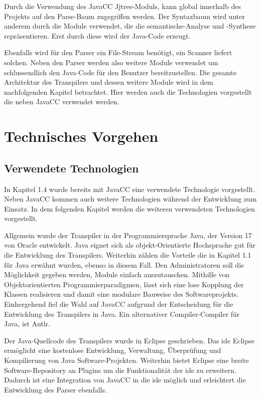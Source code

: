 Durch die Verwendung des JavaCC Jjtree-Moduls, kann global innerhalb des Projekts auf den Parse-Baum zugegriffen werden. 
Der Syntaxbaum wird unter anderem durch die Module verwendet, die die semantische-Analyse und -Synthese repräsentieren.
Erst durch diese wird der Java-Code erzeugt.

Ebenfalls wird für den Parser ein File-Stream benötigt, ein Scanner liefert solchen.
Neben den Parser werden also weitere Module verwendet um schlussendlich den Java-Code für den Benutzer bereitzustellen.
Die gesamte Architektur des Transpilers und dessen weitere Module wird in dem nachfolgenden Kapitel betrachtet. 
Hier werden auch die Technologien vorgestellt die neben JavaCC verwendet werden. 

\section{Technisches Vorgehen}
\subsection{Verwendete Technologien}
In Kapitel 1.4 wurde bereits mit JavaCC eine verwendete Technologie vorgestellt. Neben JavaCC kommen auch weitere Technologien während der Entwicklung zum Einsatz. In dem folgenden Kapitel werden die weiteren verwendeten Technologien vorgestellt.

Allgemein wurde der Transpiler in der Programmiersprache Java, der Version 17 von Oracle entwickelt. 
Java eignet sich  als objekt-Orientierte Hochsprache gut für die Entwicklung des Transpilers. 
Weiterhin zählen die Vorteile die in Kapitel 1.1 für Java erwähnt wurden, ebenso in diesem Fall. Den Administratoren soll die Möglichkeit gegeben werden, Module einfach auszutauschen. Mithilfe von Objektorientierten Programmierparadigmen, lässt sich eine lose Kopplung der Klassen realisieren und damit eine modulare Bauweise des Softwareprojekts.
Einhergehend fiel die Wahl auf JavaCC aufgrund der Entscheidung für die Entwicklung des Transpilers in Java. Ein alternativer Compiler-Compiler für Java, ist Antlr. 

Der Java-Quellcode des Transpilers wurde in Eclipse geschrieben. Das \ac{ide} Eclipse ermöglicht eine kostenlose Entwicklung, Verwaltung, Überprüfung und Kompilierung von Java Software-Projekten. Weiterhin bietet Eclipse eine breite Software-Repository an Plugins um die Funktionalität der  \ac{ide} zu erweitern. Dadurch ist eine Integration von JavaCC in die  \ac{ide} möglich und erleichtert die Entwicklung des Parser ebenfalls.

